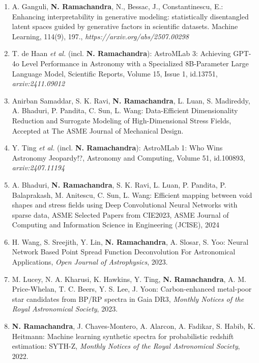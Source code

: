 \documentclass[letterpaper]{article}
\begin{document}
\begin{enumerate}


\item A. Ganguli, \textbf{N. Ramachandra}, N., Bessac, J., Constantinescu, E.: Enhancing interpretability in generative modeling: statistically disentangled latent spaces guided by generative factors in scientific datasets. Machine Learning, 114(9), 197., {\it https://arxiv.org/abs/2507.00298}


\item T. de Haan {\it et al.} (incl. \textbf{N. Ramachandra}): AstroMLab 3: Achieving GPT-4o Level Performance in Astronomy with a Specialized 8B-Parameter Large Language Model, Scientific Reports, Volume 15, Issue 1, id.13751, {\it arxiv:2411.09012}


\item Anirban Samaddar, S. K. Ravi, \textbf{N. Ramachandra}, L. Luan,  S. Madireddy, A. Bhaduri, P. Pandita, C. Sun, L. Wang: Data-Efficient Dimensionality Reduction and Surrogate Modeling of High-Dimensional Stress Fields, Accepted at The ASME Journal of Mechanical Design.



\item Y. Ting {\it et al.} (incl. \textbf{N. Ramachandra}): AstroMLab 1: Who Wins Astronomy Jeopardy!?, Astronomy and Computing, Volume 51, id.100893, {\it arxiv:2407.11194}

\item A. Bhaduri, \textbf{N. Ramachandra}, S. K. Ravi, L. Luan, P. Pandita, P. Balaprakash, M. Anitescu, C. Sun, L. Wang: Efficient mapping between void shapes and stress fields using Deep Convolutional Neural Networks with sparse data, ASME Selected Papers from CIE2023, ASME Journal of Computing and Information Science in Engineering (JCISE), 2024 

\item H. Wang, S. Sreejith, Y. Lin, \textbf{N. Ramachandra}, A. Slosar, S. Yoo: Neural Network Based Point Spread Function Deconvolution For Astronomical Applications, {\it Open Journal of Astrophysics}, 2023.

\item M. Lucey, N. A. Kharusi, K. Hawkins, Y. Ting, \textbf{N. Ramachandra}, A. M. Price-Whelan, T. C. Beers, Y. S. Lee, J. Yoon: Carbon-enhanced metal-poor star candidates from BP/RP spectra in Gaia DR3, {\it Monthly Notices of the Royal Astronomical Society}, 2023.


\item \textbf{N. Ramachandra}, J. Chaves-Montero, A. Alarcon, A. Fadikar, S. Habib, K. Heitmann: Machine learning synthetic spectra for probabilistic redshift estimation: SYTH-Z, {\it Monthly Notices of the Royal Astronomical Society}, 2022.


\end{enumerate}
\end{document}
